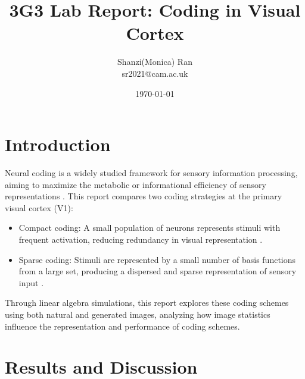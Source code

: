 \documentclass[11pt, twocolumn]{article}
\begin{document}
\singlespacing
\title{\Large \textbf{3G3 Lab Report: Coding in Visual Cortex}}
\author{Shanzi(Monica) Ran\\
sr2021@cam.ac.uk}
\date{\small \today}
\maketitle

\section{Introduction}

Neural coding is a widely studied framework for sensory information processing, aiming to maximize the metabolic or informational efficiency of sensory representations \cite{willmore_2001_characterizing}. This report compares two coding strategies at the primary visual cortex (V1):

\begin{itemize}
\item Compact coding: A small population of neurons represents stimuli with frequent activation, reducing redundancy in visual representation \cite{olshausen_2004_sparse, field_1994_what}.
\item Sparse coding: Stimuli are represented by a small number of basis functions from a large set, producing a dispersed and sparse representation of sensory input \cite{olshausen_2004_sparse,field_1994_what}.
\end{itemize}

Through linear algebra simulations, this report explores these coding schemes using both natural and generated images, analyzing how image statistics influence the representation and performance of coding schemes.

\vspace{-1em}
\section{Results and Discussion}
\vspace{-1em}
\end{document}
